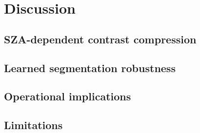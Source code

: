 \documentclass[review,jog]{igs}
\begin{document}
\section{Discussion}

\subsection{SZA-dependent contrast compression}

\subsection{Learned segmentation robustness}

\subsection{Operational implications}

\subsection{Limitations}
\end{document}
